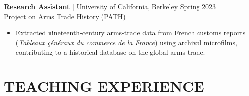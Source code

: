 \documentclass[a4paper,11pt]{article}
\begin{document}
\enlargethispage{2\baselineskip}

\normalsize{\textbf{Research Assistant} $|$ University of California, Berkeley \hfill Spring 2023 \\
Project on Arms Trade History (PATH)}
\small{\begin{itemize}[itemsep=0em, before=\vspace{-0.9em}, after=\vspace{-0.25em}]
    \item Extracted nineteenth-century arms-trade data from French customs reports (\emph{Tableaux généraux du commerce de la France}) using archival microfilms, contributing to a historical database on the global arms trade.
\end{itemize}}


\section{TEACHING EXPERIENCE}
\end{document}
